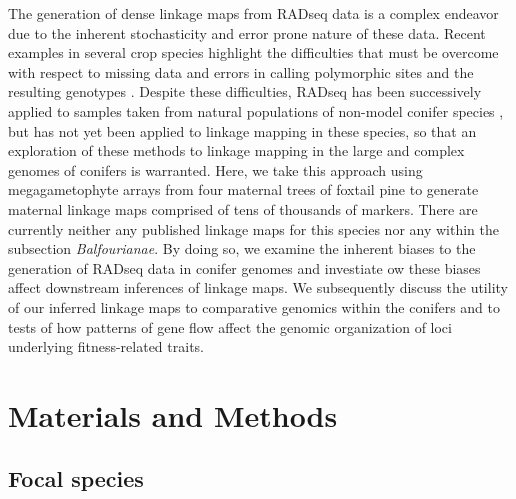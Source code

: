 \documentclass[11pt]{article}
\begin{document}
The generation of dense linkage maps from RADseq data is a complex endeavor due to the inherent stochasticity
and error prone nature of these data. Recent examples in several crop species highlight the
difficulties that must be overcome with respect to missing data and errors in calling polymorphic sites 
and the resulting genotypes \citep{Pfender:2011, Ward:2013}. Despite these difficulties, RADseq has been 
successively applied to samples taken from natural populations of non-model conifer species \citep{Parchman:2012}, but has not yet 
been applied to linkage mapping in these species, so that an exploration of these methods to linkage mapping in the large and complex 
genomes of conifers is warranted. Here, we take this approach using megagametophyte arrays from four maternal trees of foxtail pine
to generate maternal linkage maps comprised of tens of thousands of markers. There are currently neither any published linkage 
maps for this species nor any within the subsection \textit{Balfourianae}. By doing so, we examine the inherent biases
to the generation of RADseq data in conifer genomes and investiate ow these biases affect downstream inferences of 
linkage maps. We subsequently discuss the utility of our inferred linkage maps to comparative genomics within the 
conifers and to tests of how patterns of gene flow affect the genomic organization of loci underlying fitness-related traits.

\section*{Materials and Methods}\label{s:materialsandmethods}

\subsection*{Focal species}\label{ss:species}
\end{document}
